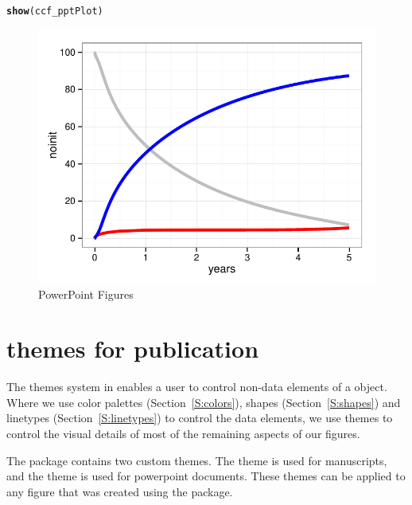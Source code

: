 \documentclass[nojss]{jss}\usepackage[]{graphicx}\usepackage[]{color}
\makeatletter
\def\maxwidth{ %
  \ifdim\Gin@nat@width>\linewidth
    \linewidth
  \else
    \Gin@nat@width
  \fi
}
\newcommand{\hlstd}[1]{\textcolor[rgb]{0.345,0.345,0.345}{#1}}%
\newcommand{\hlkwd}[1]{\textcolor[rgb]{0.737,0.353,0.396}{\textbf{#1}}}%
\newenvironment{kframe}{%
 \def\at@end@of@kframe{}%
 \ifinner\ifhmode%
  \def\at@end@of@kframe{\end{minipage}}%
  \begin{minipage}{\columnwidth}%
 \fi\fi%
 \def\FrameCommand##1{\hskip\@totalleftmargin \hskip-\fboxsep
 \colorbox{shadecolor}{##1}\hskip-\fboxsep
     \hskip-\linewidth \hskip-\@totalleftmargin \hskip\columnwidth}%
 \MakeFramed {\advance\hsize-\width
   \@totalleftmargin\z@ \linewidth\hsize
   \@setminipage}}%
 {\par\unskip\endMakeFramed%
 \at@end@of@kframe}
\newenvironment{knitrout}{}{} %
\makeatother
\begin{document}
\begin{knitrout}
\begin{kframe}
\begin{alltt}
\hlkwd{show}\hlstd{(ccf_pptPlot)}
\end{alltt}
\end{kframe}\begin{figure}[htpb]


{\centering \includegraphics[width=\maxwidth]{figure/beamer-powerpoint} 

}

\caption[PowerPoint Figures]{PowerPoint Figures\label{F:powerpoint}}
\end{figure}


\end{knitrout}


\section[Themes for publications]{ themes for publication}\label{S:themes}
The themes system in  enables a user to control non-data elements of a  object. Where we use color palettes (Section~\ref{S:colors}), shapes (Section~\ref{S:shapes}) and linetypes (Section~\ref{S:linetypes}) to control the data elements, we use themes to control the visual details of most of the remaining aspects of our figures. 

The  package contains two custom themes. The  theme is used for manuscripts, and the  theme is used for powerpoint documents. These themes can be applied to any figure that was created using the  package.  
\end{document}
